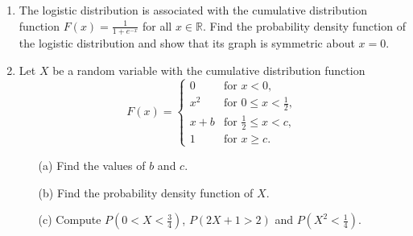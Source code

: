 \documentclass[11pt]{article}
\newcommand{\ds}{\displaystyle}
\begin{document}
\begin{enumerate}
\item
The logistic distribution is associated with the cumulative distribution function $\ds F(x) = \frac{1}{1 + e^{-x}}$ for all $x \in {\mathbb R}$. Find the probability density function of the logistic distribution and show that its graph is symmetric about $x=0$.

\item
Let $X$ be a random variable with the cumulative distribution function
$$
F(x) = \left\{\begin{array}{cl}
0 & \mbox{for $x < 0$}, \\
x^2 & \mbox{for $\ds 0 \leq x < \frac{1}{2}$},\\
x + b & \mbox{for $\ds \frac{1}{2} \leq x < c$},\\
1 & \mbox{for $x \geq c$}.
\end{array}
\right.
$$
\begin{enumerate}
\item[(a)]
Find the values of $b$ and $c$.
\item[(b)]
Find the probability density function of $X$.
\item[(c)]
Compute $\ds P\left(0 < X < \frac{3}{4}\right)$, $P(2X + 1 > 2)$ and $\ds P\left(X^2 < \frac{1}{4}\right)$.
\end{enumerate}

\end{enumerate}
\end{document}
